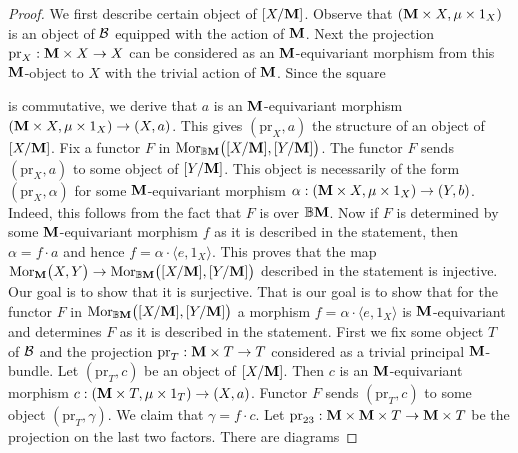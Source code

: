 \begin{proof}
We first describe certain object of $[X/\mathbf{M}]$. Observe that $(\mathbf{M}\times X,\mu\times 1_X)$ is an object of ${\mathcal B}$ equipped with the action of $\mathbf{M}$. Next the projection $\mathrm{pr}_X:\mathbf{M}\times X\rightarrow X$ can be considered as an $\mathbf{M}$-equivariant morphism from this $\mathbf{M}$-object to $X$ with the trivial action of $\mathbf{M}$. Since the square
\begin{center}
\end{center}
is commutative, we derive that $a$ is an $\mathbf{M}$-equivariant morphism $\left(\mathbf{M}\times X,\mu\times 1_X\right)\rightarrow \left(X,a\right)$. This gives $(\mathrm{pr}_X,a)$ the structure of an object of $[X/\mathbf{M}]$. Fix a functor $F$ in $\mathrm{Mor}_{\mathbb{B}\mathbf{M}}\big([X/\mathbf{M}],[Y/\mathbf{M}]\big)$. The functor $F$ sends $\left(\mathrm{pr}_X,a\right)$ to some object of $[Y/\mathbf{M}]$. This object is necessarily of the form $(\mathrm{pr}_X,\alpha)$ for some $\mathbf{M}$-equivariant morphism $\alpha:\left(\mathbf{M}\times X,\mu\times 1_X\right) \rightarrow \left(Y,b\right)$. Indeed, this follows from the fact that $F$ is over $\mathbb{B}\mathbf{M}$. Now if $F$ is determined by some $\mathbf{M}$-equivariant morphism $f$ as it is described in the statement, then $\alpha = f\cdot a$ and hence $f = \alpha \cdot \langle e,1_X\rangle$. This proves that the map $\mathrm{Mor}_{\mathbf{M}}\big(X,Y\big)\rightarrow \mathrm{Mor}_{\mathbb{B}\mathbf{M}}\big([X/\mathbf{M}],[Y/\mathbf{M}]\big)$ described in the statement is injective. Our goal is to show that it is surjective. That is our goal is to show that for the functor $F$ in $\mathrm{Mor}_{\mathbb{B}\mathbf{M}}\big([X/\mathbf{M}],[Y/\mathbf{M}]\big)$ a morphism $f = \alpha \cdot \langle e, 1_X\rangle$ is $\mathbf{M}$-equivariant and determines $F$ as it is described in the statement. First we fix some object $T$ of ${\mathcal B}$ and the projection $\mathrm{pr}_T:\mathbf{M}\times T\rightarrow T$ considered as a trivial principal $\mathbf{M}$-bundle. Let $(\mathrm{pr}_T,c)$ be an object of $[X/\mathbf{M}]$. Then $c$ is an $\mathbf{M}$-equivariant morphism $c:\left(\mathbf{M}\times T,\mu\times 1_T\right) \rightarrow (X,a)$. Functor $F$ sends $(\mathrm{pr}_T,c)$ to some object $(\mathrm{pr}_T,\gamma)$. We claim that $\gamma = f \cdot c$. Let $\mathrm{pr}_{23}:\mathbf{M}\times \mathbf{M}\times T\rightarrow \mathbf{M}\times T$ be the projection on the last two factors. There are diagrams

\end{proof}
